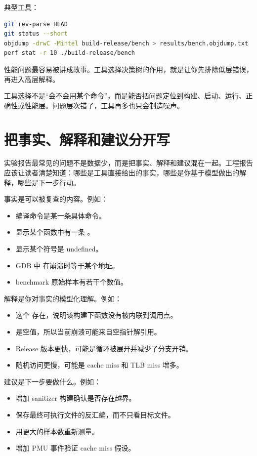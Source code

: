 典型工具：

\begin{lstlisting}[language=bash]
git rev-parse HEAD
git status --short
objdump -drwC -Mintel build-release/bench > results/bench.objdump.txt
perf stat -r 10 ./build-release/bench
\end{lstlisting}

性能问题最容易被讲成故事。工具选择决策树的作用，就是让你先排除低层错误，再进入高层解释。

\begin{keyidea}
工具选择不是“会不会用某个命令”，而是能否把问题定位到构建、启动、运行、正确性或性能层。问题层次错了，工具再多也只会制造噪声。
\end{keyidea}

\section{把事实、解释和建议分开写}

实验报告最常见的问题不是数据少，而是把事实、解释和建议混在一起。工程报告应该让读者清楚知道：哪些是工具直接给出的事实，哪些是你基于模型做出的解释，哪些是下一步行动。

事实是可以被复查的内容。例如：

\begin{itemize}
  \item 编译命令是某一条具体命令。
  \item {} 显示某个函数中有一条 。
  \item {} 显示某个符号是 undefined。
  \item GDB 中  在崩溃时等于某个地址。
  \item benchmark 原始样本有若干个数值。
\end{itemize}

解释是你对事实的模型化理解。例如：

\begin{itemize}
  \item 这个  存在，说明该构建下函数没有被内联到调用点。
  \item {} 是空值，所以当前崩溃可能来自空指针解引用。
  \item Release 版本更快，可能是循环被展开并减少了分支开销。
  \item 随机访问更慢，可能是 cache miss 和 TLB miss 增多。
\end{itemize}

建议是下一步要做什么。例如：

\begin{itemize}
  \item 增加 sanitizer 构建确认是否存在越界。
  \item 保存最终可执行文件的反汇编，而不只看目标文件。
  \item 用更大的样本数重新测量。
  \item 增加 PMU 事件验证 cache miss 假设。
\end{itemize}

